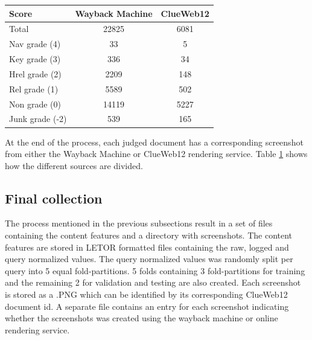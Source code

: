 \begin{table}[h]
  \begin{tabular}{ l | c | c  }
    Score & Wayback Machine & ClueWeb12 \\
    \hline
    Total & 22825 & 6081 \\
    Nav grade (4) & 33 & 5 \\
    Key grade (3) & 336 & 34 \\
    Hrel grade (2) & 2209 & 148 \\
    Rel grade (1) & 5589 & 502 \\
    Non grade (0) & 14119 & 5227 \\
    Junk grade (-2) & 539 & 165 \\
    \hline
  \end{tabular}
   \label{tab:countsources} 
\end{table}

At the end of the process, each judged document has a corresponding screenshot from either the Wayback Machine or ClueWeb12 rendering service. Table \ref{tab:countsources} shows how the different sources are divided.

\subsection{Final collection}
The process mentioned in the previous subsections result in a set of files containing the content features and a directory with screenshots. The content features are stored in LETOR formatted files containing the raw, logged and query normalized values. The query normalized values was randomly split per query into 5 equal fold-partitions. 5 folds containing 3 fold-partitions for training and the remaining 2 for validation and testing are also created. Each screenshot is stored as a .PNG which can be identified by its corresponding ClueWeb12 document id. A separate file contains an entry for each screenshot indicating whether the screenshots was created using the wayback machine or online rendering service. 

